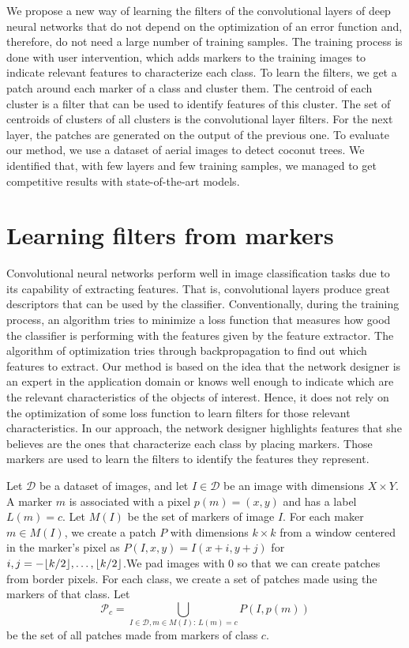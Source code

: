 \documentclass[a4paper,conference]{IEEEtran}
\DeclarePairedDelimiter\floor{\lfloor}{\rfloor}
\newcommand{\D}{\mathcal{D}}
\begin{document}
We propose a new way of learning the filters of the convolutional layers of deep neural networks that do not depend on the optimization of an error function and, therefore, do not need a large number of training samples. The training process is done with user intervention, which adds markers to the training images to indicate relevant features to characterize each class. To learn the filters, we get a patch around each marker of a class and cluster them. The centroid of each cluster is a filter that can be used to identify features of this cluster. The set of centroids of clusters of all clusters is the convolutional layer filters. For the next layer, the patches are generated on the output of the previous one. To evaluate our method, we use a dataset of aerial images to detect coconut trees. We identified that, with few layers and few training samples, we managed to get competitive results with state-of-the-art models.

\section{Learning filters from markers}
\label{sec:method}

Convolutional neural networks perform well in image classification tasks due to its capability of extracting features. That is, convolutional layers produce great descriptors that can be used by the classifier. Conventionally, during the training process, an algorithm tries to minimize a loss function that measures how good the classifier is performing with the features given by the feature extractor. The algorithm of optimization tries through backpropagation to find out which features to extract. Our method is based on the idea that the network designer is an expert in the application domain or knows well enough to indicate which are the relevant characteristics of the objects of interest. Hence, it does not rely on the optimization of some loss function to learn filters for those relevant characteristics. In our approach, the network designer highlights features that she believes are the ones that characterize each class by placing markers. Those markers are used to learn the filters to identify the features they represent.

Let $\D$ be a dataset of images, and let $I \in \D$ be an image with dimensions $X \times Y$. A marker $m$ is associated with a pixel $p(m) = (x, y)$ and has a label $L(m) = c$. Let $M(I)$ be the set of markers of image $I$.  For each maker $m \in M(I)$, we create a patch $P$ with dimensions $k \times k$ from a window centered in the marker's pixel as $P(I, x ,y) = I(x+i, y+j)$ for $i, j = -\floor{k/2}, \ldots, \floor{k/2}$.We pad images with $0$ so that we can create patches from border pixels. For each class, we create a set of patches made using the markers of that class. Let \[\mathcal{P}_c = \bigcup_{ I \in \D, m \in M(I) :\, L(m) = c}{P(I, p(m))}\] be the set of all patches made from markers of class $c$.
\end{document}
